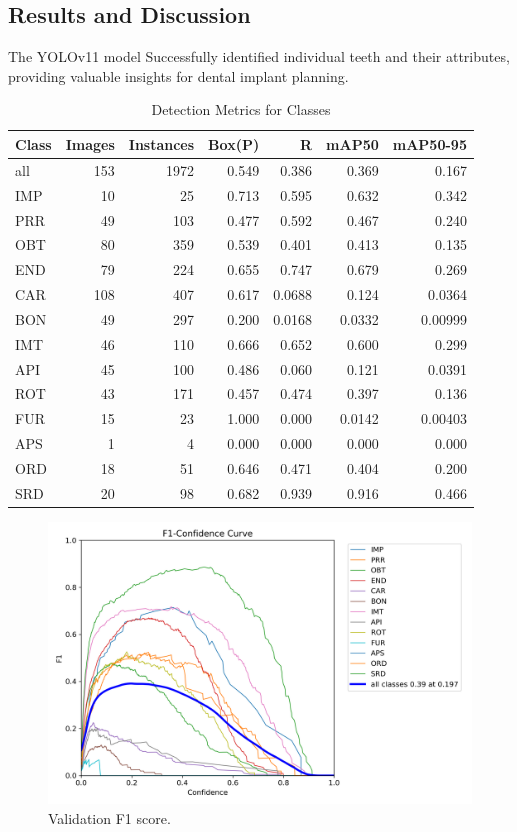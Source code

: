 \documentclass[12pt]{article}
\begin{document}
\subsection{Results and Discussion}
The YOLOv11 model Successfully identified individual teeth and their attributes, providing valuable insights for dental implant planning.

\begin{table}[htbp]
    \centering
    \caption{Detection Metrics for Classes}
    \begin{tabular}{lrrrrrr}
        \toprule
        \textbf{Class} & \textbf{Images} & \textbf{Instances} & \textbf{Box(P)} & \textbf{R} & \textbf{mAP50} & \textbf{mAP50-95} \\
        \midrule
        all  & 153  & 1972 & 0.549 & 0.386  & 0.369  & 0.167 \\
        IMP  & 10   & 25   & 0.713 & 0.595  & 0.632  & 0.342 \\
        PRR  & 49   & 103  & 0.477 & 0.592  & 0.467  & 0.240 \\
        OBT  & 80   & 359  & 0.539 & 0.401  & 0.413  & 0.135 \\
        END  & 79   & 224  & 0.655 & 0.747  & 0.679  & 0.269 \\
        CAR  & 108  & 407  & 0.617 & 0.0688 & 0.124  & 0.0364 \\
        BON  & 49   & 297  & 0.200 & 0.0168 & 0.0332 & 0.00999 \\
        IMT  & 46   & 110  & 0.666 & 0.652  & 0.600  & 0.299 \\
        API  & 45   & 100  & 0.486 & 0.060  & 0.121  & 0.0391 \\
        ROT  & 43   & 171  & 0.457 & 0.474  & 0.397  & 0.136 \\
        FUR  & 15   & 23   & 1.000 & 0.000  & 0.0142 & 0.00403 \\
        APS  & 1    & 4    & 0.000 & 0.000  & 0.000  & 0.000 \\
        ORD  & 18   & 51   & 0.646 & 0.471  & 0.404  & 0.200 \\
        SRD  & 20   & 98   & 0.682 & 0.939  & 0.916  & 0.466 \\
        \bottomrule
    \end{tabular}
    \label{tab:detection_metrics}
\end{table}

\begin{figure}[H]
    \centering
    \includegraphics[width=0.6\linewidth]{F1_curve_1.png}
    \caption{Validation F1 score.}
    \label{fig:yolo-output}
\end{figure}
\end{document}
